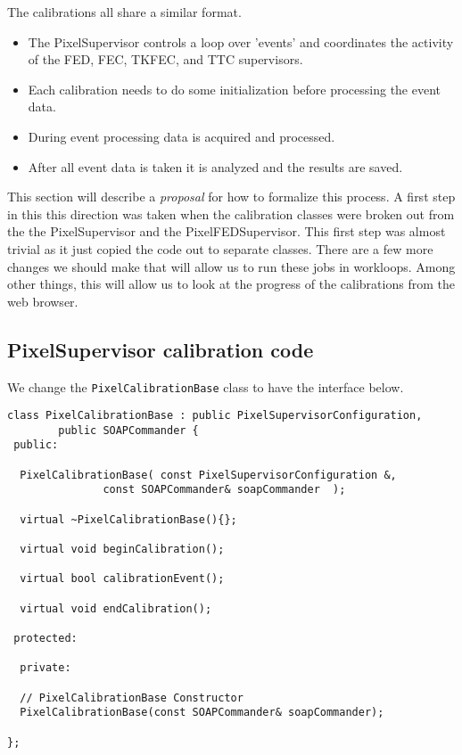 
The calibrations all share a similar format.
\begin{itemize}
\item The PixelSupervisor controls a loop over 'events' and coordinates
      the activity of the FED, FEC, TKFEC, and TTC supervisors.
\item Each calibration needs to do some initialization before processing
      the event data.
\item During event processing data is acquired and processed.
\item After all event data is taken it is analyzed and the results are
      saved.
\end{itemize}
This section will describe a {\it proposal} for how to formalize this process.
A first step in this this direction was taken when the calibration classes
were broken out from the the PixelSupervisor and the PixelFEDSupervisor.
This first step was almost trivial as it just copied the code out to
separate classes. There are a few more changes we should make that will
allow us to run these jobs in workloops. Among other things, this will 
allow us to look
at the progress of the calibrations from the web browser.

\subsection{PixelSupervisor calibration code}

We change the {\tt PixelCalibrationBase} class to have
the interface below.
\begin{verbatim}
class PixelCalibrationBase : public PixelSupervisorConfiguration, 
	    public SOAPCommander {
 public:

  PixelCalibrationBase( const PixelSupervisorConfiguration &,
			   const SOAPCommander& soapCommander  );

  virtual ~PixelCalibrationBase(){};

  virtual void beginCalibration();

  virtual bool calibrationEvent();

  virtual void endCalibration();

 protected:
  
  private:
  
  // PixelCalibrationBase Constructor
  PixelCalibrationBase(const SOAPCommander& soapCommander);

};
\end{verbatim}

